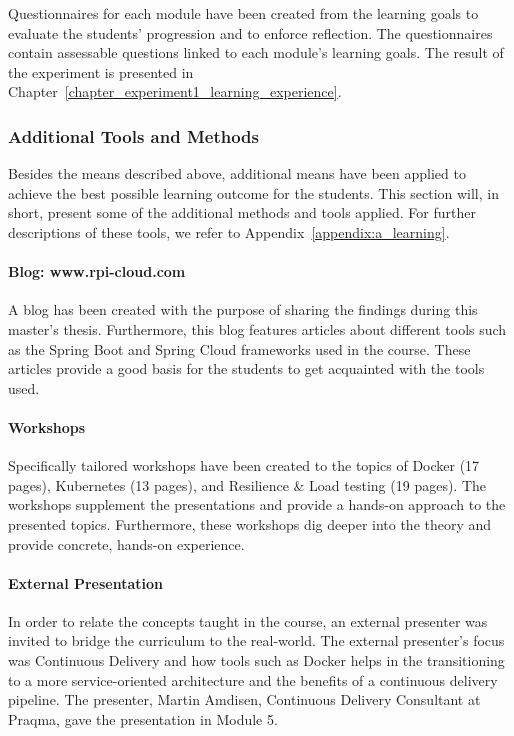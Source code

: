 \noindent
Questionnaires for each module have been created from the learning goals to evaluate the students' progression and to enforce reflection. The questionnaires contain assessable questions linked to each module's learning goals. The result of the experiment is presented in Chapter~\ref{chapter_experiment1_learning_experience}.

\subsubsection*{Additional Tools and Methods}
Besides the means described above, additional means have been applied to achieve the best possible learning outcome for the students. This section will, in short, present some of the additional methods and tools applied. For further descriptions of these tools, we refer to Appendix~\ref{appendix:a_learning}.

\paragraph{Blog: www.rpi-cloud.com}
A blog has been created with the purpose of sharing the findings during this master's thesis. Furthermore, this blog features articles about different tools such as the Spring Boot and Spring Cloud frameworks used in the course. These articles provide a good basis for the students to get acquainted with the tools used.

\paragraph{Workshops}
Specifically tailored workshops have been created to the topics of Docker (17 pages), Kubernetes (13 pages), and Resilience \& Load testing (19 pages). The workshops supplement the presentations and provide a hands-on approach to the presented topics. Furthermore, these workshops dig deeper into the theory and provide concrete, hands-on experience. 

\paragraph{External Presentation}
In order to relate the concepts taught in the course, an external presenter was invited to bridge the curriculum to the real-world. The external presenter's focus was Continuous Delivery and how tools such as Docker helps in the transitioning to a more service-oriented architecture and the benefits of a continuous delivery pipeline. The presenter, Martin Amdisen, Continuous Delivery Consultant at Praqma, gave the presentation in Module 5.

